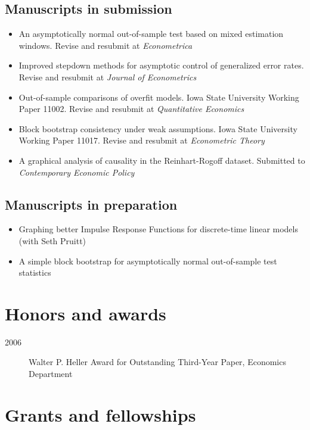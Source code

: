 \documentclass[11pt]{article}%
\newcommand{\allcaps}[1]{\textls[30]{\MakeUppercase{#1}}}
\begin{document}
\subsection*{Manuscripts in submission}

\begin{itemize}
\item An asymptotically normal out-of-sample test based on mixed
  estimation windows. Revise and resubmit at \textit{Econometrica}
\item Improved stepdown methods for asymptotic control of generalized
  error rates. Revise and resubmit at \textit{Journal of Econometrics}
\item Out-of-sample comparisons of overfit models. Iowa State
  University Working Paper 11002. Revise and resubmit at
  \textit{Quantitative Economics}
\item Block bootstrap consistency under weak assumptions. Iowa State
  University Working Paper 11017. Revise and resubmit at
  \textit{Econometric Theory}
\item A graphical analysis of causality in the Reinhart-Rogoff
  dataset. Submitted to \textit{Contemporary Economic Policy}
\end{itemize}
  
\subsection*{Manuscripts in preparation}
\begin{itemize}
\item Graphing better Impulse Response Functions for discrete-time
  linear models (with Seth Pruitt)
\item A simple block bootstrap for asymptotically normal out-of-sample
  test statistics
\end{itemize}

\section*{Honors and awards}

\begin{description}
\item[2006] Walter P. Heller Award for Outstanding Third-Year Paper,
\allcaps{UCSD} Economics Department
\end{description}

\section*{Grants and fellowships}
\end{document}
